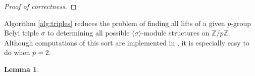 \documentclass{dcthesis}
\newcommand{\PP}{\mathbb P}
\newcommand{\ZZ}{\mathbb Z}
\newcommand{\wt}[1]{\widetilde{#1}}
\DeclareMathOperator{\Lifts}{Lifts}
\numberwithin{equation}{section}
\newtheorem{lemma}[equation]{Lemma}
\theoremstyle{definition}
\theoremstyle{remark}
\newtheorem{remark}[equation]{Remark}
\begin{document}
{{\begin{proof}[Proof of correctness]
    \end{proof}
    Algorithm \ref{alg:triples}
    reduces the problem of finding all lifts
    of a given $p$-group Belyi triple
    $\sigma$ to determining all possible
    $\langle\sigma\rangle$-module
    structures on $\ZZ/p\ZZ$.
    Although computations of this sort
    are implemented
    in \cite{magma},
    it is especially easy to do
    when $p=2$.
    \begin{lemma}

\end{lemma}}}
\end{document}
